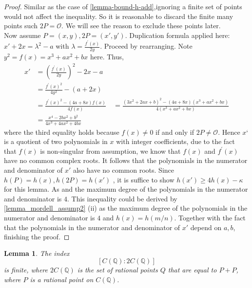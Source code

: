\documentclass[12pt]{article}
\newtheorem{lemma}{Lemma}[subsection]
\theoremstyle{remark}
\theoremstyle{definition}
\begin{document}
        \begin{proof}
            Similar as the case of \autoref{lemma-bound-h-add},ignoring a finite set of points would not affect the inequality. So it is reasonable to discard the finite many points such  $2P=\mathcal{O}$. We will see the reason to exclude these points later.\\
            Now assume $P=(x,y), 2P=(x',y')$. Duplication formula applied here:\\
            $x'+2x=\lambda^2 -a$ with $\lambda = \frac{f^\prime (x)}{2y}$. Proceed by rearranging. Note $y^2 = f(x) = x^3+ax^2+bx$ here. Thus,
            \begin{align*}
                 x' &= \left(\frac{f^\prime (x)}{2y}\right)^2-2x-a\\
                 &= \frac{f^\prime (x)^2}{4y^2}-(a+2x)\\
                 &= \frac{f^\prime (x)^2-(4a+8x)f(x)}{4f(x)}\
                 &= \frac{(3x^2+2ax+b)^2-(4a+8x)(x^3+ax^2+bx)}{4(x^3+ax^2+bx)}\\
                 &= \frac{x^4-2bx^2+b^2}{4x^3+4ax^2+4bx}
            \end{align*}
            where the third equality holds because $f(x)\neq 0$ if and only if $2P \neq \mathcal{O}$. Hence $x‘$ is a quotient of two polynomials in $x$ with integer coefficients, due to the fact that $f(x)$ is non-singular from assumption, we know that $f(x)$ and $f^\prime (x)$ have no common complex roots. It follows that the polynomials in the numerator and denominator of $x'$ also have no common roots. Since $h(P)=h(x),h(2P)=h(x')$ , it is suffice to show $h(x') \geqslant 4h(x)-\kappa$ for this lemma. As and the maximum degree of the polynomials in the numerator and denominator is $4$. This inequality could be derived by \autoref{lemma_mordell_assump2} (ii) as the maximum degree of the polynomials in the numerator and denominator is $4$ and $h(x)=h(m/n)$. Together with the fact that the polynomials in the numerator and denominator of $x'$ depend on $a, b$, finishing the proof.
            
        \end{proof}
        
        \begin{lemma}\label{lemma-fin-ind}
            The index
            $$[C(\mathbb{Q}):2C(\mathbb{Q})]$$
            is finite, where $2C(\mathbb{Q})$ is the set of rational points $Q$ that are equal to $P + P$, where $P$ is a rational point on $C(\mathbb{Q})$.
        \end{lemma}
        
\end{document}
